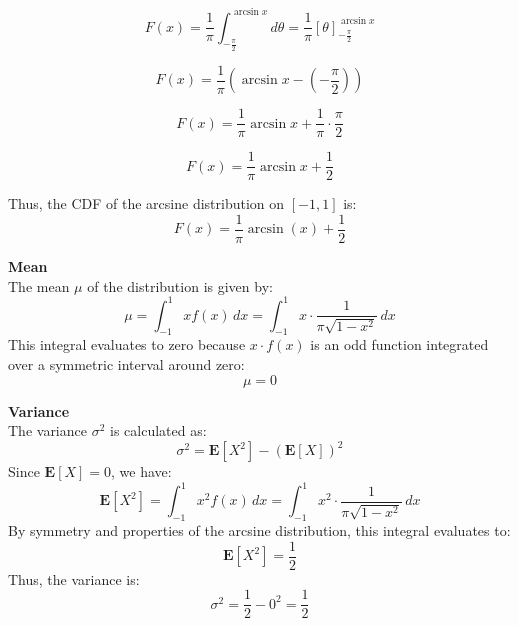 \documentclass{ioereport}
\begin{document}
\[
F(x) = \frac{1}{\pi} \int_{-\frac{\pi}{2}}^{\arcsin x} d\theta = \frac{1}{\pi} \left[ \theta \right]_{-\frac{\pi}{2}}^{\arcsin x}
\]

\[
F(x) = \frac{1}{\pi} \left( \arcsin x - \left( -\frac{\pi}{2} \right) \right)
\]

\[
F(x) = \frac{1}{\pi} \arcsin x + \frac{1}{\pi} \cdot \frac{\pi}{2}
\]

\[
F(x) = \frac{1}{\pi} \arcsin x + \frac{1}{2}
\]

Thus, the CDF of the arcsine distribution on \([-1, 1]\) is:
\[
F(x) = \frac{1}{\pi} \arcsin(x) + \frac{1}{2}
\]

\textbf{Mean}\\
The mean \(\mu\) of the distribution is given by:
\[
\mu = \int_{-1}^{1} x f(x) \, dx = \int_{-1}^{1} x \cdot \frac{1}{\pi \sqrt{1-x^2}} \, dx
\]
This integral evaluates to zero because \( x \cdot f(x) \) is an odd function integrated over a symmetric interval around zero:
\[
\mu = 0
\]

\textbf{Variance}\\
The variance \(\sigma^2\) is calculated as:
\[
\sigma^2 = \mathbf{E}[X^2] - (\mathbf{E}[X])^2
\]
Since \(\mathbf{E}[X] = 0\), we have:
\[
\mathbf{E}[X^2] = \int_{-1}^{1} x^2 f(x) \, dx = \int_{-1}^{1} x^2 \cdot \frac{1}{\pi \sqrt{1-x^2}} \, dx
\]
By symmetry and properties of the arcsine distribution, this integral evaluates to:
\[
\mathbf{E}[X^2] = \frac{1}{2}
\]
Thus, the variance is:
\[
\sigma^2 = \frac{1}{2} - 0^2 = \frac{1}{2}
\]

\pagebreak

\end{document}
